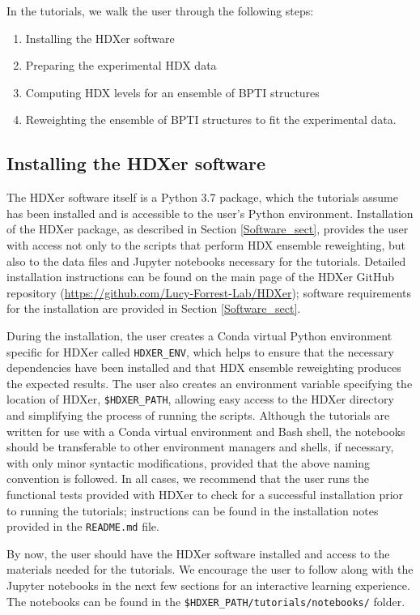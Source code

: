 \documentclass[9pt,tutorial,ASAPversion]{livecoms}
\begin{document}
In the tutorials, we walk the user through the following steps:
\begin{enumerate}
  \item Installing the HDXer software
  \item Preparing the experimental HDX data
  \item Computing HDX levels for an ensemble of BPTI structures
  \item Reweighting the ensemble of BPTI structures to fit the experimental data.
\end{enumerate}

\subsection{Installing the HDXer software}
The HDXer software itself is a Python 3.7 package, which the tutorials assume has been installed and is accessible to the user's Python environment.
Installation of the HDXer package, as described in Section \ref{Software_sect}, provides the user with access not only to the scripts that perform HDX ensemble reweighting, but also to the data files and Jupyter notebooks necessary for the tutorials.
Detailed installation instructions can be found on the main page of the HDXer GitHub repository (\url{https://github.com/Lucy-Forrest-Lab/HDXer}); software requirements for the installation are provided in Section \ref{Software_sect}. 

During the installation, the user creates a Conda virtual Python environment specific for HDXer called \texttt{HDXER\_ENV}, which helps to ensure that the necessary dependencies have been installed and that HDX ensemble reweighting produces the expected results. 
The user also creates an environment variable specifying the location of HDXer, \texttt{\$HDXER\_PATH}, allowing easy access to the HDXer directory and simplifying the process of running the scripts.
Although the tutorials are written for use with a Conda virtual environment and Bash shell, the notebooks should be transferable to other environment managers and shells, if necessary, with only minor syntactic modifications, provided that the above naming convention is followed. 
In all cases, we recommend that the user runs the functional tests provided with HDXer to check for a successful installation prior to running the tutorials; instructions can be found in the installation notes provided in the \texttt{README.md} file. 

By now, the user should have the HDXer software installed and access to the materials needed for the tutorials. We encourage the user to follow along with the Jupyter notebooks in the next few sections for an interactive learning experience.
The notebooks can be found in the \texttt{\$HDXER\_PATH/tutorials/notebooks/} folder.
\end{document}
